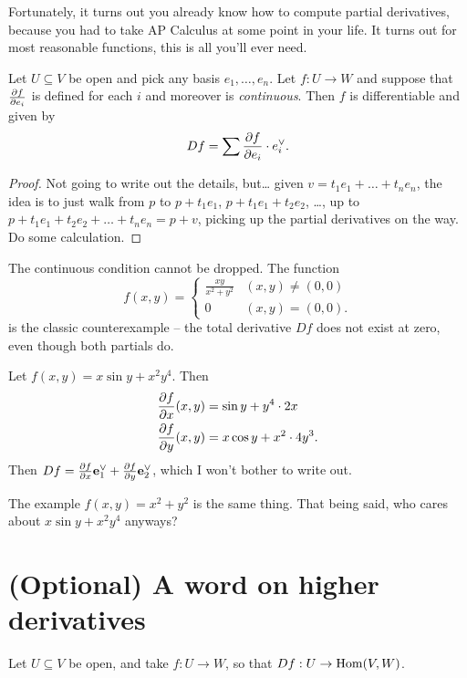 Fortunately, it turns out you already know how to compute partial derivatives,
because you had to take AP Calculus at some point in your life.
It turns out for most reasonable functions, this is all you'll ever need.
\begin{theorem}
	Let $U \subseteq V$ be open and pick any basis $e_1, \dots, e_n$.
	Let $f : U \to W$ and suppose that $\frac{\partial f}{\partial e_i}$ is defined
	for each $i$ and moreover is \emph{continuous}.
	Then $f$ is differentiable and given by
	\[ Df = \sum \frac{\partial f}{\partial e_i} \cdot e_i^\vee. \]
\end{theorem}
\begin{proof}
	Not going to write out the details, but\dots
	given $v = t_1e_1 + \dots + t_ne_n$,
	the idea is to just walk from $p$ to $p+t_1e_1$, $p+t_1e_1+t_2e_2$, \dots,
	up to $p+t_1e_1+t_2e_2+\dots+t_ne_n = p+v$,
	picking up the partial derivatives on the way.
	Do some calculation.
\end{proof}

\begin{remark}
	The continuous condition cannot be dropped. The function
	\[
			f(x,y)
		=
		\begin{cases}
			\frac{xy}{x^2+y^2} & (x,y) \neq (0,0) \\
			0 & (x,y) = (0,0).
		\end{cases}
	\]
	is the classic counterexample -- the total derivative $Df$ does not exist at zero,
	even though both partials do.
\end{remark}

\begin{example}
	Let $f(x,y) = x \sin y + x^2y^4$. Then
	\begin{align*}
		\frac{\partial f}{\partial x} (x,y) &= \sin y + y^4 \cdot 2x \\
		\frac{\partial f}{\partial y} (x,y) &= x \cos y + x^2 \cdot 4y^3.
	\end{align*}
	Then $Df = \frac{\partial f}{\partial x} \mathbf e_1^\vee + \frac{\partial f}{\partial y} \mathbf e_2^\vee$,
	which I won't bother to write out.
\end{example}

The example $f(x,y) = x^2+y^2$ is the same thing.
That being said, who cares about $x \sin y + x^2y^4$ anyways?

\section{(Optional) A word on higher derivatives}
Let $U \subseteq V$ be open, and take $f : U \to W$, so that $Df : U \to \operatorname{Hom}(V,W)$.

